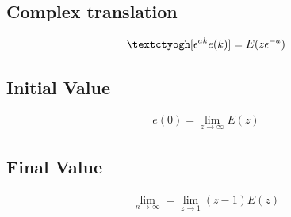 \documentclass{report}
\begin{document}
\subsection{Complex translation}
\begin{align*}
	\text{\textctyogh}[\epsilon^{ak}e(k)] = E(z\epsilon^{-a})
\end{align*}
\subsection{Initial Value}
\begin{align*}
	e(0) = \lim_{z \to \infty}E(z)
\end{align*}
\subsection{Final Value}
\begin{align*}
	\lim_{n \to \infty} = \lim_{z \to 1}(z-1)E(z)
\end{align*}



\end{document}
